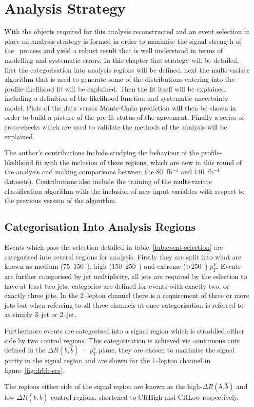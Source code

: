 \chapter{Analysis Strategy}%
\label{ch:strategy}

With the objects required for this analysis reconstructed and an event selection
in place an analysis strategy is formed in order to maximise the signal strength
of the \VHbb\ process and yield a robust result that is well understood in terms
of modelling and systematic errors. In this chapter that strategy will be
detailed, first the categorisation into analysis regions will be defined, next
the multi-variate algorithm that is used to generate some of the distributions
entering into the profile-likelihood fit will be explained. Then the fit itself
will be explained, including a definition of the likelihood function and
systematic uncertainty model. Plots of the data versus Monte-Carlo prediction
will then be shown in order to build a picture of the pre-fit status of the
agreement. Finally a series of cross-checks which are used to validate the
methods of the analysis will be explained.

The author's contributions include studying the behaviour of the
profile-likelihood fit with the inclusion of these regions, which are new in
this round of the analysis and making comparisons between the 80~fb$^{-1}$ and
140~fb$^{-1}$ datasets). Contributions also include the training of the
multi-variate classification algorithm with the inclusion of new input variables
with respect to the previous version of the algorithm.

\section{Categorisation Into Analysis Regions}
\label{sec:ana-regions}

Events which pass the selection detailed in table~\ref{tab:event-selection} are
categorised into several regions for analysis. Firstly they are split into what
are known as medium (75--150~\GeV), high (150--250~\GeV) and extreme (>250~\GeV)
$p_T^{V}$. Events are further categorised by jet multiplicity, all jets are
required by the selection to have at least two jets, categories are defined for
events with exactly two, or exactly three jets. In the 2--lepton channel there
is a requirement of three or more jets but when referring to all three channels
at once categorisation is referred to as simply 3--jet or 2--jet.

Furthermore events are categorised into a signal region which is straddled
either side by two control regions. This categorisation is achieved via
continuous cuts defined in the $\Delta R(b, \bar{b})$~--~$p_T^{V}$ plane,
they are chosen to maximise the signal purity in the signal region and are shown
for the 1--lepton channel in figure~\ref{fig:drbb-crs}.

The regions either side of the signal region are known as the
high-$\Delta R(b, \bar{b})$ and low-$\Delta R(b, \bar{b})$ control regions,
shortened to CRHigh and CRLow respectively.

